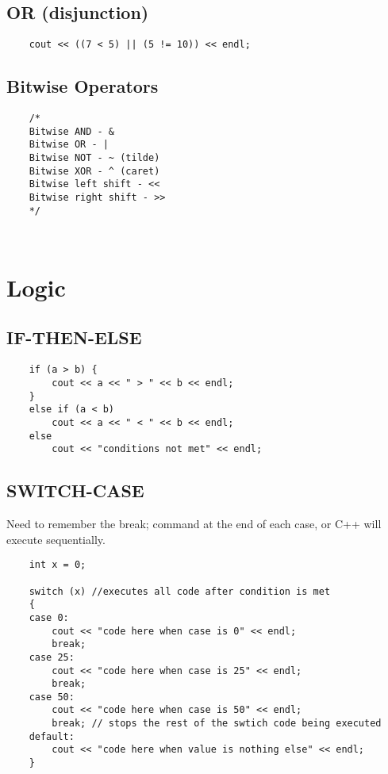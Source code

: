 \documentclass{article}
\begin{document}
\subsection{OR (disjunction)}
\begin{lstlisting}
	cout << ((7 < 5) || (5 != 10)) << endl;
\end{lstlisting}

\subsection{Bitwise Operators}
\begin{lstlisting}
	/*
	Bitwise AND - &
	Bitwise OR - |
	Bitwise NOT - ~ (tilde)
	Bitwise XOR - ^ (caret)
	Bitwise left shift - << 
	Bitwise right shift - >>
	*/
\end{lstlisting}

\subsection{}
\begin{lstlisting}

\end{lstlisting}



\section{Logic}
\subsection{IF-THEN-ELSE}
\begin{lstlisting}
	if (a > b) {
		cout << a << " > " << b << endl;
	}
	else if (a < b)
		cout << a << " < " << b << endl;
	else
		cout << "conditions not met" << endl;

\end{lstlisting}

\subsection{SWITCH-CASE}
Need to remember the break; command at the end of each case, or C++ will execute sequentially.
\begin{lstlisting}
	int x = 0;
	
	switch (x) //executes all code after condition is met
	{
	case 0:
		cout << "code here when case is 0" << endl;
		break;
	case 25:
		cout << "code here when case is 25" << endl;
		break;
	case 50:
		cout << "code here when case is 50" << endl;
		break; // stops the rest of the swtich code being executed
	default:  
		cout << "code here when value is nothing else" << endl;
	}

\end{lstlisting}
\end{document}
